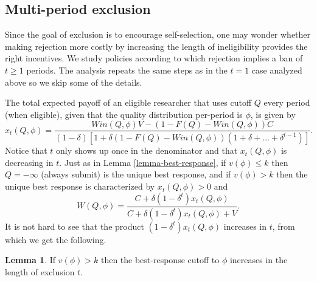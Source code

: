 \documentclass[12pt]{article}
\theoremstyle{plain}
\theoremstyle{definition}
\newtheorem{lemma}{Lemma}
\theoremstyle{remark}
\begin{document}
\subsection{Multi-period exclusion}\label{subsec-multi-period}

Since the goal of exclusion is to encourage self-selection, one may wonder whether making rejection more costly by increasing the length of ineligibility provides the right incentives. We study policies according to which rejection implies a ban of $t\ge 1$ periods. The analysis repeats the same steps as in the $t=1$ case analyzed above so we skip some of the details.

The total expected payoff of an eligible researcher that uses cutoff $Q$ every period (when eligible), given that the quality distribution per-period is $\phi$, is given by
$$x_t(Q,\phi) =\frac{Win(Q,\phi)V-(1-F(Q)-Win(Q,\phi))C}{(1-\delta)[1 + \delta(1-F(Q)-Win(Q,\phi))(1+\delta+\ldots+\delta^{t-1})]}.$$
Notice that $t$ only shows up once in the denominator and that $x_t(Q,\phi)$ is decreasing in $t$. Just as in Lemma \ref{lemma-best-response}, if $v(\phi)\le k$ then $Q=-\infty$ (always submit) is the unique best response, and if $v(\phi)>k$ then the unique best response is characterized by $x_t(Q,\phi)> 0$ and
    \begin{equation}\label{eqn-best-response-T}
        W(Q,\phi)= \frac{C+\delta(1-\delta^t)x_t(Q,\phi)}{C+\delta(1-\delta^t)x_t(Q,\phi)+V}.
    \end{equation}
It is not hard to see that the product $(1-\delta^t)x_t(Q,\phi)$ increases in $t$, from which we get the following.

\begin{lemma}\label{lemma-increasing-T}
    If $v(\phi)> k$ then the best-response cutoff to $\phi$ increases in the length of exclusion $t$.
\end{lemma}
\end{document}
